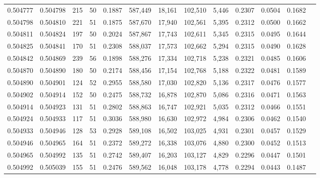 \begin{tabular}{rrrrrrrrrrrrr}
0.504777 & 0.504798 & 215 &  50 &                                     0.1887 & 587,449 &  18,161 & 102,510 &   5,446 & 0.2307 & 0.0504 & 0.1682 \\
0.504798 & 0.504810 & 221 &  51 &                                     0.1875 & 587,670 &  17,940 & 102,561 &   5,395 & 0.2312 & 0.0500 & 0.1662 \\
0.504811 & 0.504824 & 197 &  50 &                                     0.2024 & 587,867 &  17,743 & 102,611 &   5,345 & 0.2315 & 0.0495 & 0.1644 \\
0.504825 & 0.504841 & 170 &  51 &                                     0.2308 & 588,037 &  17,573 & 102,662 &   5,294 & 0.2315 & 0.0490 & 0.1628 \\
0.504842 & 0.504869 & 239 &  56 &                                     0.1898 & 588,276 &  17,334 & 102,718 &   5,238 & 0.2321 & 0.0485 & 0.1606 \\
0.504870 & 0.504890 & 180 &  50 &                                     0.2174 & 588,456 &  17,154 & 102,768 &   5,188 & 0.2322 & 0.0481 & 0.1589 \\
0.504890 & 0.504901 & 124 &  52 &                                     0.2955 & 588,580 &  17,030 & 102,820 &   5,136 & 0.2317 & 0.0476 & 0.1577 \\
0.504902 & 0.504914 & 152 &  50 &                                     0.2475 & 588,732 &  16,878 & 102,870 &   5,086 & 0.2316 & 0.0471 & 0.1563 \\
0.504914 & 0.504923 & 131 &  51 &                                     0.2802 & 588,863 &  16,747 & 102,921 &   5,035 & 0.2312 & 0.0466 & 0.1551 \\
0.504924 & 0.504933 & 117 &  51 &                                     0.3036 & 588,980 &  16,630 & 102,972 &   4,984 & 0.2306 & 0.0462 & 0.1540 \\
0.504933 & 0.504946 & 128 &  53 &                                     0.2928 & 589,108 &  16,502 & 103,025 &   4,931 & 0.2301 & 0.0457 & 0.1529 \\
0.504946 & 0.504965 & 164 &  51 &                                     0.2372 & 589,272 &  16,338 & 103,076 &   4,880 & 0.2300 & 0.0452 & 0.1513 \\
0.504965 & 0.504992 & 135 &  51 &                                     0.2742 & 589,407 &  16,203 & 103,127 &   4,829 & 0.2296 & 0.0447 & 0.1501 \\
0.504992 & 0.505039 & 155 &  51 &                                     0.2476 & 589,562 &  16,048 & 103,178 &   4,778 & 0.2294 & 0.0443 & 0.1487 \\

\end{tabular}

